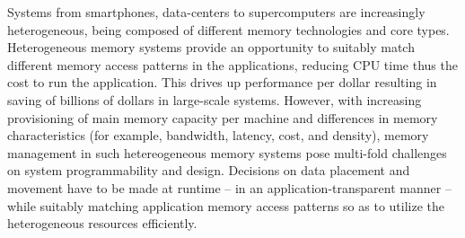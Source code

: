 
Systems from smartphones, data-centers to supercomputers are increasingly
heterogeneous, being composed of different memory technologies and core types.
Heterogeneous memory systems provide an opportunity to suitably match different
memory access patterns in the applications, reducing CPU time thus the cost to
run the application. This drives up performance per dollar resulting in saving
of billions of dollars in large-scale systems.  However, with increasing
provisioning of main memory capacity per machine and differences in memory
characteristics (for example, bandwidth, latency, cost, and density), memory
management in such hetereogeneous memory systems pose multi-fold challenges on
system programmability and design. Decisions on data placement and movement have
to be made at runtime -- in an application-transparent manner --
while suitably matching application memory access patterns so as to utilize the
heterogeneous resources efficiently.

